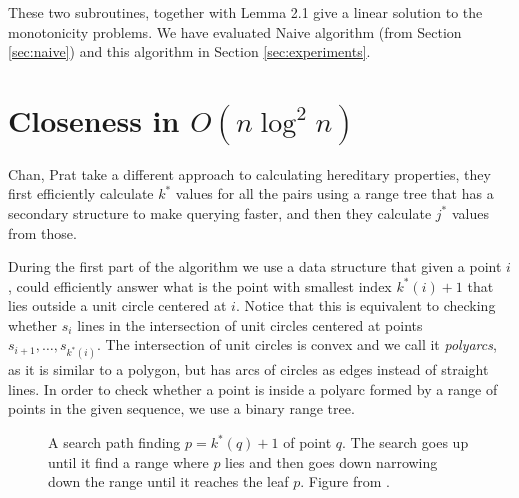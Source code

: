 \documentclass{article}
\begin{document}
These two subroutines, together with Lemma 2.1 give a linear solution
to the monotonicity problems. We have evaluated Naive algorithm
(from Section \ref{sec:naive}) and this algorithm in Section
\ref{sec:experiments}.



\section{Closeness in $O(n \log^2 n)$}
\label{sec:closeness}

Chan, Prat \cite{chan2016} take a different approach to calculating
hereditary properties, they first efficiently calculate $k^*$ values
for all the pairs using a range tree \cite{lueker1978data} that has
a secondary structure to make querying faster, and then they calculate
$j^*$ values from those.

During the first part of the algorithm we use a data structure
that given a point $i$, could efficiently answer what is the point
with smallest index $k^*(i)+1$ that lies outside a unit circle
centered at $i$. Notice that this is equivalent to checking whether
$s_i$ lines in the intersection of unit circles centered at points
$s_{i+1}, \dots, s_{k^*(i)}$. The intersection of unit circles is
convex and we call it \textit{polyarcs}, as it is similar to a
polygon, but has arcs of circles as edges instead of straight lines.
In order to check whether a point is inside a polyarc formed by a
range of points in the given sequence, we use a binary range tree.

\begin{figure}[h]
    \centering
    \label{fig:query_path}
    \caption{A search path finding $p = k^*(q) + 1$ of point $q$.
    The search goes up until it find a range where $p$ lies and
    then goes down narrowing down the range until it reaches the
    leaf $p$.
    Figure from \cite{chan2016}.}
\end{figure}
\end{document}
